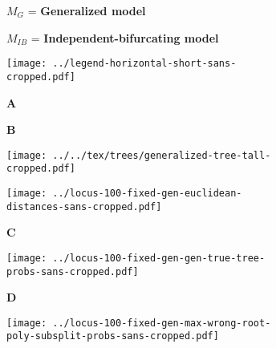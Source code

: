 \documentclass[border=10pt,varwidth=30cm]{standalone}
\begin{document}
\begin{figure}
    \centering
    \begin{subfigure}[c][][c]{0.44\textwidth}
        \centering
        \Huge $M_{G}$ = \textbf{Generalized model}
    \end{subfigure}
    \hfill
    \begin{subfigure}[c][][c]{0.54\textwidth}
        \centering
        \Huge $M_{IB}$ = \textbf{Independent-bifurcating model}
    \end{subfigure}
    \vspace{2mm}
    \begin{subfigure}[c][][c]{\textwidth}
        \centering
        \texttt{[image: ../legend-horizontal-short-sans-cropped.pdf]}
    \end{subfigure}
    \vspace{2mm}
    \begin{subfigure}[b][][l]{0.39\textwidth}
        \huge \textbf{A}
    \end{subfigure}
    \hfill
    \begin{subfigure}[b][][l]{0.59\textwidth}
        \huge \textbf{B}
    \end{subfigure}
    \vspace{2mm}
    \begin{subfigure}[c][][c]{0.39\textwidth}
        \centering
        \texttt{[image: ../../tex/trees/generalized-tree-tall-cropped.pdf]}
        \label{fig:gentree}
    \end{subfigure}
    \hfill
    \begin{subfigure}[c][][c]{0.59\textwidth}
        \centering
        \texttt{[image: ../locus-100-fixed-gen-euclidean-distances-sans-cropped.pdf]}
    \end{subfigure}
    \begin{subfigure}[b][][l]{\textwidth}
        \huge \textbf{C}
    \end{subfigure}
    \begin{subfigure}[c][][c]{\textwidth}
        \centering
        \texttt{[image: ../locus-100-fixed-gen-gen-true-tree-probs-sans-cropped.pdf]}
    \end{subfigure}
    \begin{subfigure}[b][][l]{\textwidth}
        \huge \textbf{D}
    \end{subfigure}
    \begin{subfigure}[c][][c]{\textwidth}
        \centering
        \texttt{[image: ../locus-100-fixed-gen-max-wrong-root-poly-subsplit-probs-sans-cropped.pdf]}
    \end{subfigure}
\end{figure}
\end{document}
